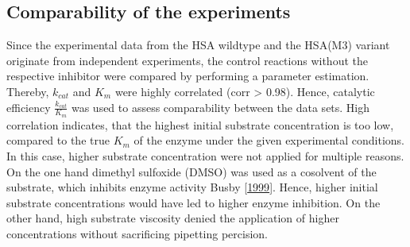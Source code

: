 \documentclass[letterpaper,10pt,english]{jupyterBook}
\begin{document}
\subsection{Comparability of the experiments}
\label{\detokenize{scenarios/chymotrypsin_inhibition:comparability-of-the-experiments}}
\sphinxAtStartPar
Since the experimental data from the HSA wild\sphinxhyphen{}type and the HSA(M3) variant originate from independent experiments, the control reactions without the respective inhibitor were compared by performing a parameter estimation. Thereby, \(k_{cat}\) and \(K_{m}\) were highly correlated (corr > 0.98). Hence, catalytic efficiency \(\frac{k_{cat}}{K_{m}}\) was used to assess comparability between the data sets. High correlation indicates, that the highest initial substrate concentration is too low, compared to the true \(K_{m}\) of the enzyme under the given experimental conditions. In this case, higher substrate concentration were not applied for multiple reasons. On the one hand dimethyl sulfoxide (DMSO) was used as a co\sphinxhyphen{}solvent of the substrate, which inhibits enzyme activity Busby  {[}\hyperlink{cite.references:id9}{1999}{]}. Hence, higher initial substrate concentrations would have led to higher enzyme inhibition. On the other hand, high substrate viscosity denied the application of higher concentrations without sacrificing pipetting percision.
\end{document}
